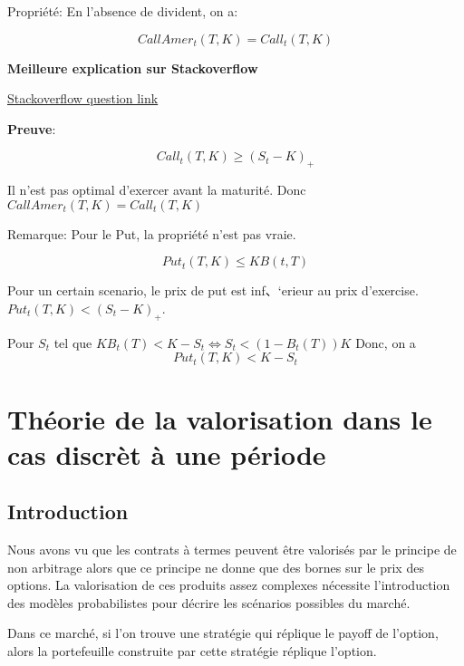 \documentclass{article}
\theoremstyle{plain}
\theoremstyle{definition}
\begin{document}
Propri\'et\'e:
En l'absence de divident, on a:

\begin{equation}
CallAmer_t(T, K) = Call_t(T, K)
\end{equation}

\textbf{Meilleure explication sur Stackoverflow}

{\color{blue}\href{http://money.stackexchange.com/questions/5161/why-are-american-style-options-worth-more-than-european-style-options}{Stackoverflow question link}}

\textbf{Preuve}:

\begin{equation}
Call_t(T, K) \geq (S_t- K)_+
\end{equation}

Il n'est pas optimal d'exercer avant la maturit\'e. Donc $CallAmer_t(T, K) = Call_t(T, K)$

Remarque: Pour le Put, la propri\'et\'e n'est pas vraie.

\begin{equation}
Put_t(T, K) \leq KB(t, T)
\end{equation}

Pour un certain scenario, le prix de put est inf、‘erieur au prix d'exercise. $Put_t(T, K)<(S_t-K)_+$.

Pour $S_t$ tel que $KB_t(T)< K-S_t \Leftrightarrow S_t < (1-B_t(T))K$
Donc, on a
\begin{equation}
Put_t(T, K)< K-S_t
\end{equation} 

\section{Th\'eorie de la valorisation dans le cas discr\`et \`a une p\'eriode}

\subsection{Introduction}
Nous avons vu que les contrats \`a termes peuvent \^{e}tre valoris\'es par le principe de non arbitrage alors que ce principe ne donne que des bornes sur le prix des options. La valorisation de ces produits assez complexes n\'ecessite l'introduction des mod\`eles probabilistes pour d\'ecrire les sc\'enarios possibles du march\'e.

Dans ce march\'e, si l'on trouve une strat\'egie qui r\'eplique le payoff de l'option, alors la portefeuille construite par cette strat\'egie r\'eplique l'option.
\end{document}
